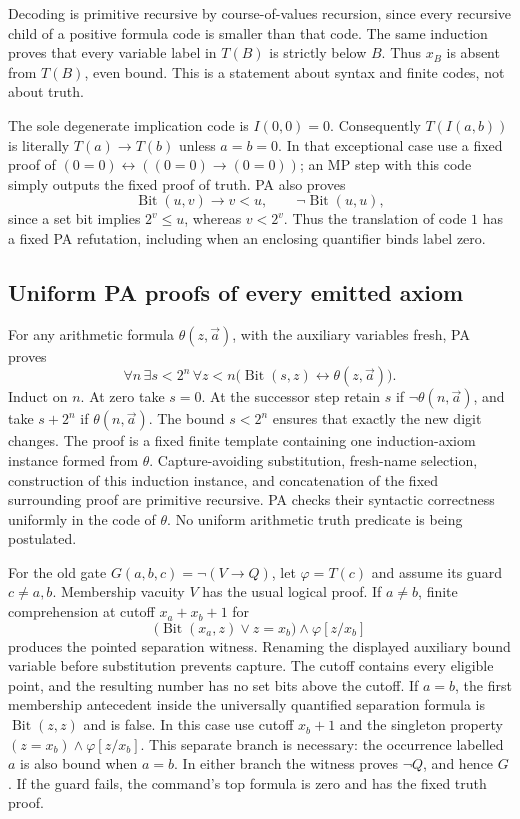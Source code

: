 Decoding is primitive recursive by course-of-values recursion, since
every recursive child of a positive formula code is smaller than that
code.  The same induction proves that every variable label in $T(B)$
is strictly below $B$.  Thus $x_B$ is absent from $T(B)$, even bound.
This is a statement about syntax and finite codes, not about truth.

The sole degenerate implication code is $I(0,0)=0$.  Consequently
$T(I(a,b))$ is literally $T(a)\to T(b)$ unless $a=b=0$.
In that exceptional case use a fixed proof of
$(0=0)\leftrightarrow((0=0)\to(0=0))$; an MP step with this code
simply outputs the fixed proof of truth.  PA also proves
\[
 \operatorname{Bit}(u,v)\longrightarrow v<u,
 \qquad \neg\operatorname{Bit}(u,u),
\]
since a set bit implies $2^v\leq u$, whereas $v<2^v$.
Thus the translation of code $1$ has a fixed PA refutation, including
when an enclosing quantifier binds label zero.

\subsection{Uniform PA proofs of every emitted axiom}

For any arithmetic formula $\theta(z,\vec a)$, with the auxiliary
variables fresh, PA proves
\[
 \forall n\,\exists s<2^n\,\forall z<n
 \bigl(\operatorname{Bit}(s,z)\leftrightarrow\theta(z,\vec a)\bigr).
\]
Induct on $n$.  At zero take $s=0$.  At the successor step retain $s$
if $\neg\theta(n,\vec a)$, and take $s+2^n$ if $\theta(n,\vec a)$.
The bound $s<2^n$ ensures that exactly the new digit changes.
The proof is a fixed finite template containing one induction-axiom
instance formed from $\theta$.  Capture-avoiding substitution, fresh-name
selection, construction of this induction instance, and concatenation
of the fixed surrounding proof are primitive recursive.  PA checks
their syntactic correctness uniformly in the code of $\theta$.
No uniform arithmetic truth predicate is being postulated.

For the old gate $G(a,b,c)=\neg(V\to Q)$, let $\varphi=T(c)$ and
assume its guard $c\ne a,b$.  Membership vacuity $V$ has the usual
logical proof.  If $a\ne b$, finite comprehension at cutoff
$x_a+x_b+1$ for
\[
 \bigl(\operatorname{Bit}(x_a,z)\lor z=x_b\bigr)
       \land\varphi[z/x_b]
\]
produces the pointed separation witness.  Renaming the displayed
auxiliary bound variable before substitution prevents capture.
The cutoff contains every eligible point, and the resulting number
has no set bits above the cutoff.  If $a=b$, the first membership
antecedent inside the universally quantified separation formula is
$\operatorname{Bit}(z,z)$ and is false.  In this case use cutoff
$x_b+1$ and the singleton property
$(z=x_b)\land\varphi[z/x_b]$.  This separate branch is necessary:
the occurrence labelled $a$ is also bound when $a=b$.
In either branch the witness proves $\neg Q$, and hence $G$.
If the guard fails, the command's top formula is zero and has the
fixed truth proof.


